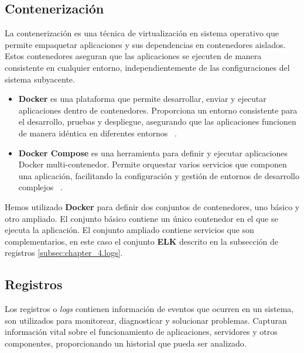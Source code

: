 \subsection*{Contenerización}

La contenerización es una técnica de virtualización en sistema operativo que permite empaquetar aplicaciones y
sus dependencias en contenedores aislados.
Estos contenedores aseguran que las aplicaciones se ejecuten de manera consistente en cualquier entorno,
independientemente de las configuraciones del sistema subyacente.

\begin{itemize}
    \item \textbf{Docker} es una plataforma que permite desarrollar, enviar y ejecutar aplicaciones dentro de
    contenedores.
    Proporciona un entorno consistente para el desarrollo, pruebas y despliegue, asegurando que las aplicaciones
    funcionen de manera idéntica en diferentes entornos ~\cite{https://docs.docker.com/}.
    \item \textbf{Docker Compose} es una herramienta para definir y ejecutar aplicaciones Docker multi-contenedor.
    Permite orquestar varios servicios que componen una aplicación, facilitando la configuración y gestión de entornos
    de desarrollo complejos ~\cite{https://docs.docker.com/compose/}.
\end{itemize}

Hemos utilizado \textbf{Docker} para definir dos conjuntos de contenedores, uno básico y otro ampliado.
El conjunto básico contiene un único contenedor en el que se ejecuta la aplicación.
El conjunto ampliado contiene servicios que son complementarios, en este caso el conjunto \textbf{ELK} descrito en la
subsección de registros  \ref{subsec:chapter_4.logs}.

\subsection*{Registros}\label{subsec:chapter_4.logs}

Los registros o \textit{logs} contienen información de eventos que ocurren en un sistema, son utilizados para
monitorear, diagnosticar y solucionar problemas.
Capturan información vital sobre el funcionamiento de aplicaciones, servidores y otros componentes, proporcionando un
historial que pueda ser analizado.

